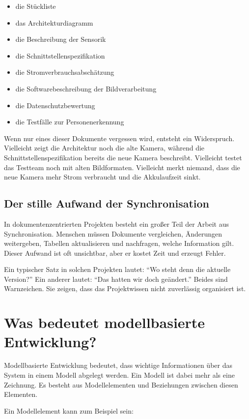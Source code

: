 \begin{itemize}
    \item die Stückliste
    \item das Architekturdiagramm
    \item die Beschreibung der Sensorik
    \item die Schnittstellenspezifikation
    \item die Stromverbrauchsabschätzung
    \item die Softwarebeschreibung der Bildverarbeitung
    \item die Datenschutzbewertung
    \item die Testfälle zur Personenerkennung
\end{itemize}

Wenn nur eines dieser Dokumente vergessen wird, entsteht ein Widerspruch. Vielleicht zeigt die Architektur noch die alte Kamera, während die Schnittstellenspezifikation bereits die neue Kamera beschreibt. Vielleicht testet das Testteam noch mit alten Bildformaten. Vielleicht merkt niemand, dass die neue Kamera mehr Strom verbraucht und die Akkulaufzeit sinkt.

\subsection{Der stille Aufwand der Synchronisation}
In dokumentenzentrierten Projekten besteht ein großer Teil der Arbeit aus Synchronisation. Menschen müssen Dokumente vergleichen, Änderungen weitergeben, Tabellen aktualisieren und nachfragen, welche Information gilt. Dieser Aufwand ist oft unsichtbar, aber er kostet Zeit und erzeugt Fehler.

Ein typischer Satz in solchen Projekten lautet: \enquote{Wo steht denn die aktuelle Version?} Ein anderer lautet: \enquote{Das hatten wir doch geändert.} Beides sind Warnzeichen. Sie zeigen, dass das Projektwissen nicht zuverlässig organisiert ist.

\section{Was bedeutet modellbasierte Entwicklung?}
Modellbasierte Entwicklung bedeutet, dass wichtige Informationen über das System in einem Modell abgelegt werden. Ein Modell ist dabei mehr als eine Zeichnung. Es besteht aus Modellelementen und Beziehungen zwischen diesen Elementen.

Ein Modellelement kann zum Beispiel sein:

